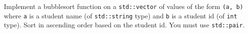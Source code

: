   Implement a bubblesort function on a \verb!std::vector! of values
  of the form \verb!(a, b)! where \verb!a! is a student name (of \verb!std::string! type)
  and \verb!b! is a student id (of \verb!int! type).
  Sort in ascending order based on the student id.
  You must use \verb!std::pair!.
